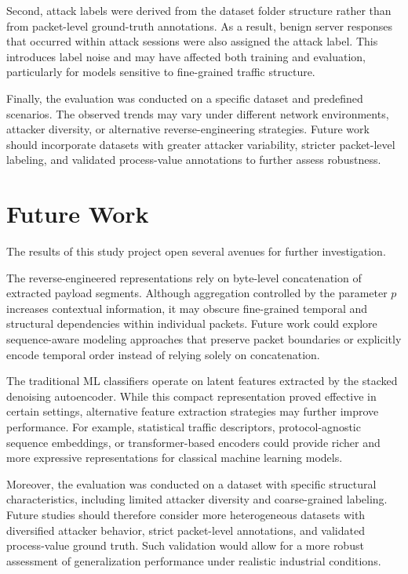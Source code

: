 Second, attack labels were derived from the dataset folder structure
rather than from packet-level ground-truth annotations. As a result,
benign server responses that occurred within attack sessions were
also assigned the attack label. This introduces label noise and may
have affected both training and evaluation, particularly for models
sensitive to fine-grained traffic structure.



Finally, the evaluation was conducted on a specific dataset and
predefined scenarios. The observed trends may vary under different
network environments, attacker diversity, or alternative
reverse-engineering strategies. Future work should incorporate
datasets with greater attacker variability, stricter packet-level
labeling, and validated process-value annotations to further
assess robustness.

\section{Future Work}

The results of this study project open several avenues for further investigation.

The reverse-engineered representations rely on byte-level concatenation
of extracted payload segments. Although aggregation controlled by the
parameter $p$ increases contextual information, it may obscure
fine-grained temporal and structural dependencies within individual
packets. Future work could explore sequence-aware modeling approaches
that preserve packet boundaries or explicitly encode temporal order
instead of relying solely on concatenation.

The traditional \ac{ML} classifiers operate on latent features extracted
by the stacked denoising autoencoder. While this compact representation
proved effective in certain settings, alternative feature extraction
strategies may further improve performance. For example, statistical
traffic descriptors, protocol-agnostic sequence embeddings, or
transformer-based encoders could provide richer and more expressive
representations for classical machine learning models.

Moreover, the evaluation was conducted on a dataset with specific
structural characteristics, including limited attacker diversity and
coarse-grained labeling. Future studies should therefore consider
more heterogeneous datasets with diversified attacker behavior,
strict packet-level annotations, and validated process-value ground
truth. Such validation would allow for a more robust assessment of
generalization performance under realistic industrial conditions.